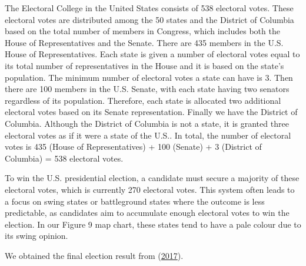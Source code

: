 \documentclass[
  11pt,
]{article}
\begin{document}
The Electoral College in the United States consists of 538 electoral
votes. These electoral votes are distributed among the 50 states and the
District of Columbia based on the total number of members in Congress,
which includes both the House of Representatives and the Senate. There
are 435 members in the U.S. House of Representatives. Each state is
given a number of electoral votes equal to its total number of
representatives in the House and it is based on the state's population.
The minimum number of electoral votes a state can have is 3. Then there
are 100 members in the U.S. Senate, with each state having two senators
regardless of its population. Therefore, each state is allocated two
additional electoral votes based on its Senate representation. Finally
we have the District of Columbia. Although the District of Columbia is
not a state, it is granted three electoral votes as if it were a state
of the U.S.. In total, the number of electoral votes is 435 (House of
Representatives) + 100 (Senate) + 3 (District of Columbia) = 538
electoral votes.

To win the U.S. presidential election, a candidate must secure a
majority of these electoral votes, which is currently 270 electoral
votes. This system often leads to a focus on swing states or
battleground states where the outcome is less predictable, as candidates
aim to accumulate enough electoral votes to win the election. In our
Figure 9 map chart, these states tend to have a pale colour due to its
swing opinion.

We obtained the final election result from
(\protect\hyperlink{ref-Final}{2017}).
\end{document}
